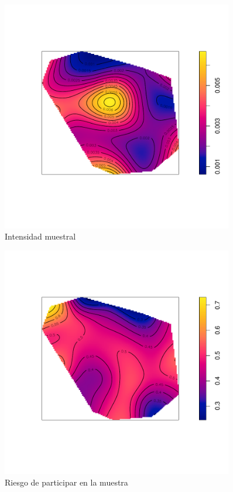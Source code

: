 \begin{figure}[h]
	\centering
	\includegraphics[width=0.9\textwidth]{graficos/intensity_sample.pdf}
	\caption{Intensidad muestral} \label{intensity_sample}
\end{figure}

\newpage

\begin{figure}[h]
	\centering
	\includegraphics[width=0.9\textwidth]{graficos/risk_to_sampling.pdf}
	\caption{Riesgo de participar en la muestra}
	\label{risk_to_sampling}
\end{figure}

